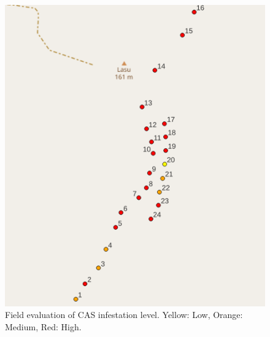 \documentclass[12pt,letterpaper,english,bibliography=totocnumbered, abstract=on]{scrartcl}
\begin{document}
\begin{figure}[p]
	\centering
	\includegraphics[width=\linewidth]{../sticky_traps/scale_level}
	\caption{Field evaluation of CAS infestation level. Yellow: Low, Orange: Medium, Red: High.}
	\label{fig:scalelevel}
\end{figure}
\end{document}
